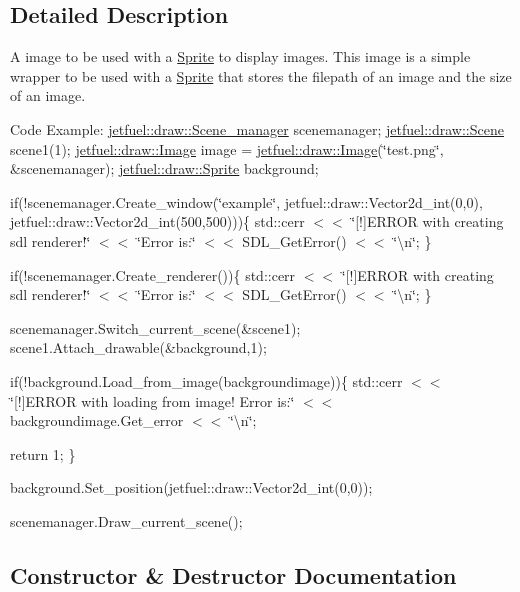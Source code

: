\subsection{Detailed Description}
A image to be used with a \hyperlink{classjetfuel_1_1draw_1_1Sprite}{Sprite} to display images. This image is a simple wrapper to be used with a \hyperlink{classjetfuel_1_1draw_1_1Sprite}{Sprite} that stores the filepath of an image and the size of an image.

Code Example\+: \hyperlink{classjetfuel_1_1draw_1_1Scene__manager}{jetfuel\+::draw\+::\+Scene\+\_\+manager} scenemanager; \hyperlink{classjetfuel_1_1draw_1_1Scene}{jetfuel\+::draw\+::\+Scene} scene1(1); \hyperlink{classjetfuel_1_1draw_1_1Image}{jetfuel\+::draw\+::\+Image} image = \hyperlink{classjetfuel_1_1draw_1_1Image}{jetfuel\+::draw\+::\+Image}(\char`\"{}test.\+png\char`\"{}, \&scenemanager); \hyperlink{classjetfuel_1_1draw_1_1Sprite}{jetfuel\+::draw\+::\+Sprite} background;

if(!scenemanager.Create\+\_\+window(\char`\"{}example\char`\"{}, jetfuel\+::draw\+::\+Vector2d\+\_\+int(0,0), jetfuel\+::draw\+::\+Vector2d\+\_\+int(500,500)))\{ std\+::cerr $<$$<$ \char`\"{}\mbox{[}!\mbox{]}\+E\+R\+R\+O\+R with creating sdl renderer!\char`\"{} $<$$<$ \char`\"{}\+Error is\+:\char`\"{} $<$$<$ S\+D\+L\+\_\+\+Get\+Error() $<$$<$ \char`\"{}\textbackslash{}n\char`\"{}; \}

if(!scenemanager.Create\+\_\+renderer())\{ std\+::cerr $<$$<$ \char`\"{}\mbox{[}!\mbox{]}\+E\+R\+R\+O\+R with creating sdl renderer!\char`\"{} $<$$<$ \char`\"{}\+Error is\+:\char`\"{} $<$$<$ S\+D\+L\+\_\+\+Get\+Error() $<$$<$ \char`\"{}\textbackslash{}n\char`\"{}; \}

scenemanager.\+Switch\+\_\+current\+\_\+scene(\&scene1); scene1.\+Attach\+\_\+drawable(\&background,1);

if(!background.Load\+\_\+from\+\_\+image(backgroundimage))\{ std\+::cerr $<$$<$ \char`\"{}\mbox{[}!\mbox{]}\+E\+R\+R\+O\+R with loading from image! Error is\+:\char`\"{} $<$$<$ backgroundimage.\+Get\+\_\+error $<$$<$ \char`\"{}\textbackslash{}n\char`\"{};

return 1; \}

background.\+Set\+\_\+position(jetfuel\+::draw\+::\+Vector2d\+\_\+int(0,0));

scenemanager.\+Draw\+\_\+current\+\_\+scene(); 

\subsection{Constructor \& Destructor Documentation}
\mbox{\label{classjetfuel_1_1draw_1_1Image_a63078fc295eb37ef549e17187d839574}} 
